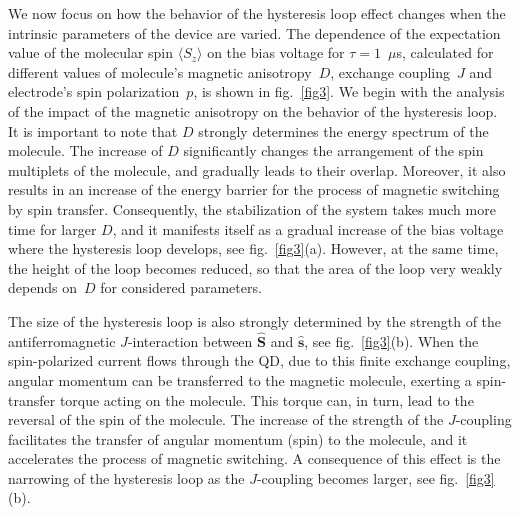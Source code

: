 \documentclass[doublecol]{epl2} %
\newcommand{\veco}[1]{\hat{\bm{#1}}}
\begin{document}
We now focus on how the behavior of the hysteresis loop effect changes
when the intrinsic parameters of the device are varied.
The dependence of the expectation value of the molecular spin 
$\langle S_z \rangle$
on the bias voltage for \mbox{$\tau = 1$}~$\mu$s,
calculated for different values of molecule's magnetic anisotropy~$D$,
exchange coupling~$J$ and electrode's spin polarization~$p$,
is shown in fig.~\ref{fig3}.
%
We begin with the analysis of  the impact of the magnetic anisotropy on the behavior of the hysteresis loop.
It is important to note that $D$ strongly determines the energy spectrum of the molecule.
The increase of $D$ significantly changes the arrangement of the spin multiplets of the molecule,
and gradually leads to their overlap. Moreover, it also
results in an increase of the energy barrier for the process of magnetic switching by spin transfer.
Consequently, the stabilization of the system takes much more time
for larger $D$, and it manifests itself as a gradual increase of 
the bias voltage where the hysteresis loop develops, see
fig.~\ref{fig3}(a).
However, at the same time, the height of the loop
becomes reduced, so that the area of the loop very weakly depends on~$D$
for considered parameters.


The size of the hysteresis loop is also strongly determined
by the strength of the antiferromagnetic \mbox{$J$-inter}\-action
between $\veco{S}$ and $\veco{s}$, see fig.~\ref{fig3}(b).
When the spin-polarized current flows through the QD,
due to this finite exchange coupling, angular momentum can be transferred to the magnetic molecule,
exerting a spin-transfer torque acting on the molecule.
This torque can, in turn, lead to the reversal of the spin of the molecule.
The increase of the strength of the $J$-coupling
facilitates the transfer of angular momentum (spin) to the molecule,
and it accelerates the process of magnetic switching.
A consequence of this effect is the narrowing
of the hysteresis loop as the $J$-coupling becomes larger,
see fig.~\ref{fig3}(b).

\end{document}
